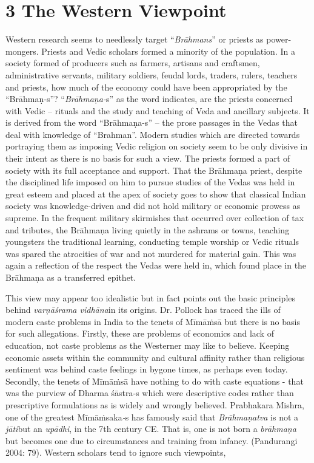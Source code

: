 \vspace{-.3cm}

\section*{3 The Western Viewpoint}

Western research seems to needlessly target “\textit{Brāhmans}” or priests as power-mongers. Priests and Vedic scholars formed a minority of the population. In a society formed of producers such as farmers, artisans and craftsmen, administrative servants, military soldiers, feudal lords, traders, rulers, teachers and priests, how much of the economy could have been appropriated by the “Brāhmaṇ-s”? “\textit{Brāhmaṇa-}s” as the word indicates, are the priests concerned with Vedic – rituals and the study and teaching of Veda and ancillary subjects. It is derived from the word “Brāhmaṇa-s” – the prose passages in the Vedas that deal with knowledge of “Brahman”. Modern studies which are directed towards portraying them as imposing Vedic religion on society seem to be only divisive in their intent as there is no basis for such a view. The priests formed a part of society with its full acceptance and support. That the Brāhmaṇa priest, despite the disciplined life imposed on him to pursue studies of the Vedas was held in great esteem and placed at the apex of society goes to show that classical Indian society was knowledge-driven and did not hold military or economic prowess as supreme. In the frequent military skirmishes that occurred over collection of tax and tributes, the Brāhmaṇa living quietly in the ashrams or towns, teaching youngsters the traditional learning, conducting temple worship or Vedic rituals was spared the atrocities of war and not murdered for material gain. This was again a reflection of the respect the Vedas were held in, which found place in the Brāhmaṇa as a transferred epithet.

This view may appear too idealistic but in fact points out the basic principles behind \textit{varṇāśrama vidhāna}in its origins. Dr. Pollock has traced the ills of modern caste problems in India to the tenets of Mīmāṁsā but there is no basis for such allegations. Firstly, these are problems of economics and lack of education, not caste problems as the Westerner may like to believe. Keeping economic assets within the community and cultural affinity rather than religious sentiment was behind caste feelings in bygone times, as perhaps even today. Secondly, the tenets of Mīmāṁsā have nothing to do with caste equations - that was the purview of Dharma śāstra-s which were descriptive codes rather than prescriptive formulations as is widely and wrongly believed. Prabhakara Mishra, one of the greatest Mīmāṁsaka\textit{-}s has famously said that \textit{Brāhmaṇatva} is not a \textit{jāti}but an \textit{upādhi}, in the 7th century CE. That is, one is not born a \textit{brāhmaṇa} but becomes one due to circumstances and training from infancy. (Pandurangi 2004: 79). Western scholars tend to ignore such viewpoints,

